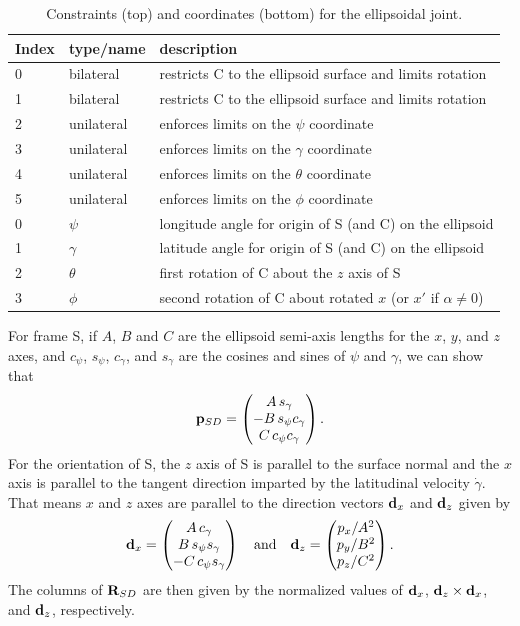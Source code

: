 \begin{table}[h]
\centering
\begin{tabular}{|l|l|l|}
\hline
Index & type/name & description \\
\hline
0 & bilateral & restricts C to the ellipsoid surface and limits rotation \\
1 & bilateral & restricts C to the ellipsoid surface and limits rotation \\
2 & unilateral & enforces limits on the $\psi$ coordinate \\
3 & unilateral & enforces limits on the $\gamma$ coordinate \\
4 & unilateral & enforces limits on the $\theta$ coordinate \\
5 & unilateral & enforces limits on the $\phi$ coordinate \\
\hline
\hline
0 & $\psi$ & longitude angle for origin of S (and C) on the ellipsoid \\
1 & $\gamma$ & latitude angle for origin of S (and C) on the ellipsoid \\
2 & $\theta$ & first rotation of C about the $z$ axis of S \\
3 & $\phi$ & second rotation of C about rotated $x$ (or $x'$ if $\alpha \ne 0$) \\
\hline
\end{tabular}
\caption{Constraints (top) and coordinates (bottom) for the
ellipsoidal joint.}
\label{EllipsoidalConstraints:tbl}
\end{table}

For frame S, if $A$, $B$ and $C$ are the ellipsoid semi-axis lengths
for the $x$, $y$, and $z$ axes, and $c_\psi$, $s_\psi$, $c_\gamma$,
and $s_\gamma$ are the cosines and sines of $\psi$ and $\gamma$, we
can show that
%
\begin{equation*}
{\bf p}_{SD} = \left(\begin{matrix} A \, s_\gamma \\ -B \, s_\psi c_\gamma \\ C \, c_\psi c_\gamma \end{matrix}\right).
\end{equation*}
%
For the orientation of S, the $z$ axis of S is parallel to the surface
normal and the $x$ axis is parallel to the tangent direction imparted
by the latitudinal velocity $\dot\gamma$.  That means $x$ and $z$
axes are parallel to the direction vectors ${\bf d}_x$ and ${\bf d}_z$
given by
%
\begin{equation}
{\bf d}_x = \left(\begin{matrix} A \, c_\gamma \\ B \, s_\psi s_\gamma \\ -C \, c_\psi s_\gamma \end{matrix}\right)
\quad \text{and} \quad
{\bf d}_z = \left(\begin{matrix} p_x/A^2 \\ p_y/B^2 \\ p_z/C^2 \end{matrix}\right).
\label{xzdirections:eqn}
\end{equation}
%
The columns of ${\bf R}_{SD}$ are then given by the normalized values
of ${\bf d}_x$, ${\bf d}_z \times {\bf d}_x$, and ${\bf d}_z$, respectively.

